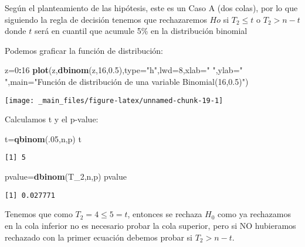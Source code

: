 \documentclass[a4paper,oneside,openany]{book}
\newenvironment{Shaded}{\begin{snugshade}}{\end{snugshade}}
\newcommand{\KeywordTok}[1]{\textcolor[rgb]{0.13,0.29,0.53}{\textbf{#1}}}
\newcommand{\DataTypeTok}[1]{\textcolor[rgb]{0.13,0.29,0.53}{#1}}
\newcommand{\DecValTok}[1]{\textcolor[rgb]{0.00,0.00,0.81}{#1}}
\newcommand{\FloatTok}[1]{\textcolor[rgb]{0.00,0.00,0.81}{#1}}
\newcommand{\StringTok}[1]{\textcolor[rgb]{0.31,0.60,0.02}{#1}}
\newcommand{\OperatorTok}[1]{\textcolor[rgb]{0.81,0.36,0.00}{\textbf{#1}}}
\newcommand{\NormalTok}[1]{#1}
\begin{document}
Según el planteamiento de las hipótesis, este es un Caso A (dos colas),
por lo que siguiendo la regla de decisión tenemos que rechazaremos
\(Ho\) si \(T_2 \leq t\) o \(T_2>n-t\) donde \(t\) será en cuantil que
acumule 5\% en la distribución binomial

Podemos graficar la función de distribución:

\begin{Shaded}
\begin{Highlighting}[]
\NormalTok{z=}\DecValTok{0}\OperatorTok{:}\DecValTok{16}
\KeywordTok{plot}\NormalTok{(z,}\KeywordTok{dbinom}\NormalTok{(z,}\DecValTok{16}\NormalTok{,}\FloatTok{0.5}\NormalTok{),}\DataTypeTok{type=}\StringTok{"h"}\NormalTok{,}\DataTypeTok{lwd=}\DecValTok{8}\NormalTok{,}\DataTypeTok{xlab=}\StringTok{" "}\NormalTok{,}\DataTypeTok{ylab=}\StringTok{" "}\NormalTok{,}\DataTypeTok{main=}\StringTok{"Función de distribución de una variable Binomial(16,0.5)"}\NormalTok{)}
\end{Highlighting}
\end{Shaded}

\begin{center}\texttt{[image: \_main\_files/figure-latex/unnamed-chunk-19-1]} \end{center}

Calculamos t y el p-value:

\begin{Shaded}
\begin{Highlighting}[]
\NormalTok{t=}\KeywordTok{qbinom}\NormalTok{(.}\DecValTok{05}\NormalTok{,n,p)}
\NormalTok{t}
\end{Highlighting}
\end{Shaded}

\begin{verbatim}
[1] 5
\end{verbatim}

\begin{Shaded}
\begin{Highlighting}[]
\NormalTok{pvalue=}\KeywordTok{dbinom}\NormalTok{(T_}\DecValTok{2}\NormalTok{,n,p)}
\NormalTok{pvalue}
\end{Highlighting}
\end{Shaded}

\begin{verbatim}
[1] 0.027771
\end{verbatim}

Tenemos que como \(T_2=4\leq 5 =t\), entonces se rechaza \(H_0\) como ya
rechazamos en la cola inferior no es necesario probar la cola superior,
pero si NO hubieramos rechazado con la primer ecuación debemos probar si
\(T_2>n-t\).
\end{document}
